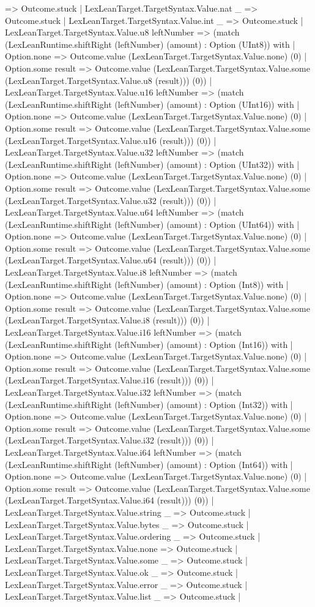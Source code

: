 \documentclass[11pt]{article}
\begin{document}
=> Outcome.stuck | LexLeanTarget.TargetSyntax.Value.nat \_ => Outcome.stuck | LexLeanTarget.TargetSyntax.Value.int \_ => Outcome.stuck | LexLeanTarget.TargetSyntax.Value.u8 leftNumber => (match (LexLeanRuntime.shiftRight (leftNumber) (amount) : Option (UInt8)) with | Option.none => Outcome.value (LexLeanTarget.TargetSyntax.Value.none) (0) | Option.some result => Outcome.value (LexLeanTarget.TargetSyntax.Value.some (LexLeanTarget.TargetSyntax.Value.u8 (result))) (0)) | LexLeanTarget.TargetSyntax.Value.u16 leftNumber => (match (LexLeanRuntime.shiftRight (leftNumber) (amount) : Option (UInt16)) with | Option.none => Outcome.value (LexLeanTarget.TargetSyntax.Value.none) (0) | Option.some result => Outcome.value (LexLeanTarget.TargetSyntax.Value.some (LexLeanTarget.TargetSyntax.Value.u16 (result))) (0)) | LexLeanTarget.TargetSyntax.Value.u32 leftNumber => (match (LexLeanRuntime.shiftRight (leftNumber) (amount) : Option (UInt32)) with | Option.none => Outcome.value (LexLeanTarget.TargetSyntax.Value.none) (0) | Option.some result => Outcome.value (LexLeanTarget.TargetSyntax.Value.some (LexLeanTarget.TargetSyntax.Value.u32 (result))) (0)) | LexLeanTarget.TargetSyntax.Value.u64 leftNumber => (match (LexLeanRuntime.shiftRight (leftNumber) (amount) : Option (UInt64)) with | Option.none => Outcome.value (LexLeanTarget.TargetSyntax.Value.none) (0) | Option.some result => Outcome.value (LexLeanTarget.TargetSyntax.Value.some (LexLeanTarget.TargetSyntax.Value.u64 (result))) (0)) | LexLeanTarget.TargetSyntax.Value.i8 leftNumber => (match (LexLeanRuntime.shiftRight (leftNumber) (amount) : Option (Int8)) with | Option.none => Outcome.value (LexLeanTarget.TargetSyntax.Value.none) (0) | Option.some result => Outcome.value (LexLeanTarget.TargetSyntax.Value.some (LexLeanTarget.TargetSyntax.Value.i8 (result))) (0)) | LexLeanTarget.TargetSyntax.Value.i16 leftNumber => (match (LexLeanRuntime.shiftRight (leftNumber) (amount) : Option (Int16)) with | Option.none => Outcome.value (LexLeanTarget.TargetSyntax.Value.none) (0) | Option.some result => Outcome.value (LexLeanTarget.TargetSyntax.Value.some (LexLeanTarget.TargetSyntax.Value.i16 (result))) (0)) | LexLeanTarget.TargetSyntax.Value.i32 leftNumber => (match (LexLeanRuntime.shiftRight (leftNumber) (amount) : Option (Int32)) with | Option.none => Outcome.value (LexLeanTarget.TargetSyntax.Value.none) (0) | Option.some result => Outcome.value (LexLeanTarget.TargetSyntax.Value.some (LexLeanTarget.TargetSyntax.Value.i32 (result))) (0)) | LexLeanTarget.TargetSyntax.Value.i64 leftNumber => (match (LexLeanRuntime.shiftRight (leftNumber) (amount) : Option (Int64)) with | Option.none => Outcome.value (LexLeanTarget.TargetSyntax.Value.none) (0) | Option.some result => Outcome.value (LexLeanTarget.TargetSyntax.Value.some (LexLeanTarget.TargetSyntax.Value.i64 (result))) (0)) | LexLeanTarget.TargetSyntax.Value.string \_ => Outcome.stuck | LexLeanTarget.TargetSyntax.Value.bytes \_ => Outcome.stuck | LexLeanTarget.TargetSyntax.Value.ordering \_ => Outcome.stuck | LexLeanTarget.TargetSyntax.Value.none => Outcome.stuck | LexLeanTarget.TargetSyntax.Value.some \_ => Outcome.stuck | LexLeanTarget.TargetSyntax.Value.ok \_ => Outcome.stuck | LexLeanTarget.TargetSyntax.Value.error \_ => Outcome.stuck | LexLeanTarget.TargetSyntax.Value.list \_ => Outcome.stuck | 
\end{document}
